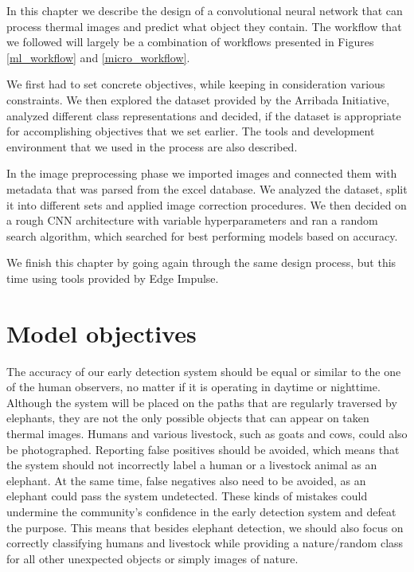 In this chapter we describe the design of a convolutional neural network that can process thermal images and predict what object they contain.
The workflow that we followed will largely be a combination of workflows presented in Figures \ref{ml_workflow} and \ref{micro_workflow}.

We first had to set concrete objectives, while keeping in consideration various constraints.
We then explored the dataset provided by the Arribada Initiative, analyzed different class representations and decided, if the dataset is appropriate for accomplishing objectives that we set earlier.
The tools and development environment that we used in the process are also described.

In the image preprocessing phase we imported images and connected them with metadata that was parsed from the excel database.
We analyzed the dataset, split it into different sets and applied image correction procedures.
We then decided on a rough CNN architecture with variable hyperparameters and ran a random search algorithm, which searched for best performing models based on accuracy.

We finish this chapter by going again through the same design process, but this time using tools provided by Edge Impulse.


\section{ Model objectives}


The accuracy of our early detection system should be equal or similar to the one of the human observers, no matter if it is operating in daytime or nighttime.
Although the system will be placed on the paths that are regularly traversed by elephants, they are not the only possible objects that can appear on taken thermal images.
Humans and various livestock, such as goats and cows, could also be photographed.
Reporting false positives should be avoided, which means that the system should not incorrectly label a human or a livestock animal as an elephant.
At the same time, false negatives also need to be avoided, as an elephant could pass the system undetected.
These kinds of mistakes could undermine the community's confidence in the early detection system and defeat the purpose.
This means that besides elephant detection, we should also focus on correctly classifying humans and livestock while providing a nature/random class for all other unexpected objects or simply images of nature.

